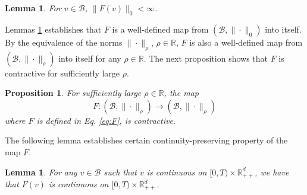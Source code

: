 \documentclass[11pt]{article}
\theoremstyle{definition}
\theoremstyle{plain}
\newtheorem{proposition}[assumption]{Proposition}
\newtheorem{lemma}[assumption]{Lemma}
\newcommand{\cH}{{\cal H}}
\begin{document}

\begin{lemma}\label{lem:Fv-bounded}
For \( v \in \mathcal{B} \), \( \|F(v)\|_0 < \infty \).
\end{lemma}

Lemmas \ref{lem:Fv-bounded} %
establishes that \( F \) is a well-defined map from  
\( (\mathcal{B}, \|\cdot\|_0) \) into itself.  
By the equivalence of the norms \( \|\cdot\|_\rho \), \( \rho \in \mathbb{R} \),  
\( F \) is also a well-defined map from \( (\mathcal{B}, \|\cdot\|_\rho) \) into itself  
for any \( \rho \in \mathbb{R} \). The next proposition shows that  
\( F \) is contractive for sufficiently large \( \rho \).

\begin{proposition}\label{prop:F-contraction}
For sufficiently large \( \rho \in \mathbb{R} \), the map
\[
F: (\mathcal{B}, \|\cdot\|_\rho) \to (\mathcal{B}, \|\cdot\|_\rho)
\]
where $F$ is defined in Eq. \eqref{eq:F}, is contractive.
\end{proposition}

The following lemma establishes certain continuity-preserving property of the map $F$.
\begin{lemma}\label{lem:Fv-continuous}
For any \( v \in \mathcal{B} \) such that $v$ is continuous on \( [0,T) \times \mathbb{R}_{++}^d \), 
we have that \( F(v) \) is continuous on \( [0,T) \times \mathbb{R}_{++}^d \).
\end{lemma}
\end{document}
